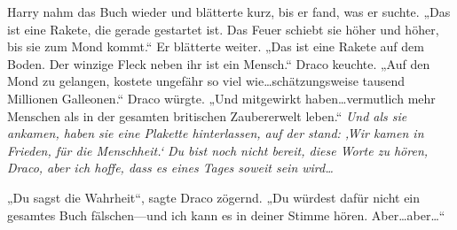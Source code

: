 Harry nahm das Buch wieder und blätterte kurz, bis er fand, was er suchte. „Das ist eine Rakete, die gerade gestartet ist. Das Feuer schiebt sie höher und höher, bis sie zum Mond kommt.“ Er blätterte weiter. „Das ist eine Rakete auf dem Boden. Der winzige Fleck neben ihr ist ein Mensch.“ Draco keuchte. „Auf den Mond zu gelangen, kostete ungefähr so viel wie…schätzungsweise tausend Millionen Galleonen.“ Draco würgte. „Und mitgewirkt haben…vermutlich mehr Menschen als in der gesamten britischen Zaubererwelt leben.“ \emph{Und als sie ankamen, haben sie eine Plakette hinterlassen, auf der stand: ‚Wir kamen in Frieden, für die Menschheit.‘ Du bist noch nicht bereit, diese Worte zu hören, Draco, aber ich hoffe, dass es eines Tages soweit sein wird…}

„Du sagst die Wahrheit“, sagte Draco zögernd. „Du würdest dafür nicht ein gesamtes Buch fälschen—und ich kann es in deiner Stimme hören. Aber…aber…“

